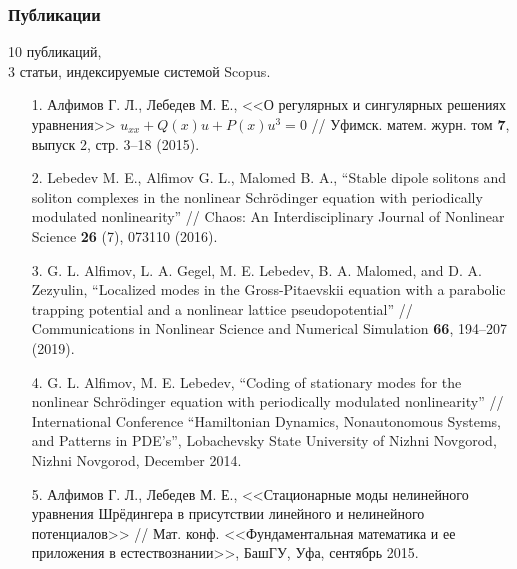 \documentclass [10pt] {beamer}
\begin{document}
\begin{frame}
	\frametitle{Публикации}
	
	\begin{large}
	{
		\color{ceruleanblue}
		10 публикаций, \\
		3 статьи, индексируемые системой Scopus.
	}	
	\end{large}

	\medskip

	\begin{scriptsize}
	\begin{enumerate}
		\setlength\itemsep{10pt}
		\item[1.] Алфимов Г. Л., Лебедев М. Е., <<О регулярных и сингулярных решениях уравнения>> $u_{xx} + Q(x) u + P(x) u^3 = 0$ // Уфимск. матем. журн. том {\bf 7}, выпуск 2, стр. 3--18 (2015).
		\item[2.] Lebedev M. E., Alfimov G. L., Malomed B. A., ``Stable dipole solitons and soliton complexes in the nonlinear Schr\"odinger equation with periodically modulated nonlinearity'' // Chaos: An Interdisciplinary Journal of Nonlinear Science {\bf 26} (7), 073110 (2016).
		\item[3.] G. L. Alfimov, L. A. Gegel, M. E. Lebedev, B. A. Malomed, and D. A. Zezyulin, ``Localized modes in the Gross-Pitaevskii equation with a parabolic trapping potential and a nonlinear lattice pseudopotential'' // Communications in Nonlinear Science and Numerical Simulation {\bf 66}, 194–207 (2019).
		\item[4.] G. L. Alfimov, M. E. Lebedev, ``Coding of stationary modes for the nonlinear Schrödinger equation with periodically modulated nonlinearity'' // International Conference ``Hamiltonian Dynamics, Nonautonomous Systems, and Patterns in PDE's'', Lobachevsky State University of Nizhni Novgorod, Nizhni Novgorod, December 2014.
		\item[5.] Алфимов Г. Л., Лебедев М. Е., <<Стационарные моды нелинейного уравнения Шрёдингера в присутствии линейного и нелинейного потенциалов>> // Мат. конф. <<Фундаментальная математика и ее приложения в естествознании>>, БашГУ, Уфа, сентябрь 2015.
	\end{enumerate}
	\end{scriptsize}
\end{frame}
\end{document}
